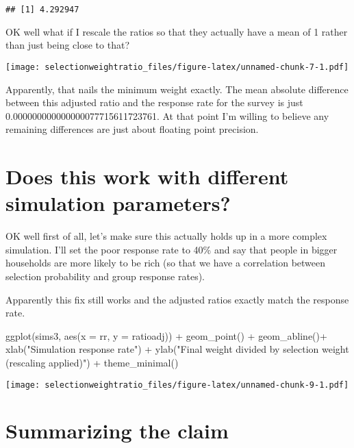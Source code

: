 \documentclass[
]{article}
\newenvironment{Shaded}{\begin{snugshade}}{\end{snugshade}}
\newcommand{\AttributeTok}[1]{\textcolor[rgb]{0.77,0.63,0.00}{#1}}
\newcommand{\FunctionTok}[1]{\textcolor[rgb]{0.00,0.00,0.00}{#1}}
\newcommand{\NormalTok}[1]{#1}
\newcommand{\SpecialCharTok}[1]{\textcolor[rgb]{0.00,0.00,0.00}{#1}}
\newcommand{\StringTok}[1]{\textcolor[rgb]{0.31,0.60,0.02}{#1}}
\begin{document}
\begin{verbatim}
## [1] 4.292947
\end{verbatim}

OK well what if I rescale the ratios so that they actually have a mean
of 1 rather than just being close to that?

\texttt{[image: selectionweightratio\_files/figure-latex/unnamed-chunk-7-1.pdf]}

Apparently, that nails the minimum weight exactly. The mean absolute
difference between this adjusted ratio and the response rate for the
survey is just 0.000000000000000077715611723761. At that point I'm
willing to believe any remaining differences are just about floating
point precision.

\hypertarget{does-this-work-with-different-simulation-parameters}{%
\section{Does this work with different simulation
parameters?}\label{does-this-work-with-different-simulation-parameters}}

OK well first of all, let's make sure this actually holds up in a more
complex simulation. I'll set the poor response rate to 40\% and say that
people in bigger households are more likely to be rich (so that we have
a correlation between selection probability and group response rates).

Apparently this fix still works and the adjusted ratios exactly match
the response rate.

\begin{Shaded}
\begin{Highlighting}[]
\FunctionTok{ggplot}\NormalTok{(sims3, }\FunctionTok{aes}\NormalTok{(}\AttributeTok{x =}\NormalTok{ rr, }\AttributeTok{y =}\NormalTok{ ratioadj)) }\SpecialCharTok{+} \FunctionTok{geom\_point}\NormalTok{() }\SpecialCharTok{+} \FunctionTok{geom\_abline}\NormalTok{()}\SpecialCharTok{+} 
  \FunctionTok{xlab}\NormalTok{(}\StringTok{"Simulation response rate"}\NormalTok{) }\SpecialCharTok{+} 
  \FunctionTok{ylab}\NormalTok{(}\StringTok{"Final weight divided by selection weight (rescaling applied)"}\NormalTok{) }\SpecialCharTok{+} 
  \FunctionTok{theme\_minimal}\NormalTok{()}
\end{Highlighting}
\end{Shaded}

\texttt{[image: selectionweightratio\_files/figure-latex/unnamed-chunk-9-1.pdf]}

\hypertarget{summarizing-the-claim}{%
\section{Summarizing the claim}\label{summarizing-the-claim}}
\end{document}
